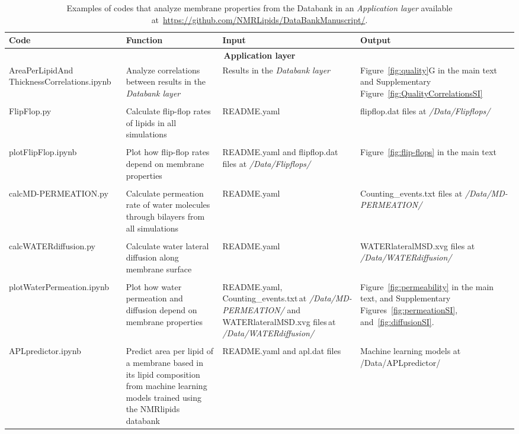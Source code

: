 \documentclass[fleqn,10pt]{wlscirepSI}
\begin{document}
\begin{table}[!h]
    \centering
    \begin{tabular}{p{3.5cm}  p{4.5cm}  p{3.0cm}  p{4.0cm}}
        Code & Function & Input & Output \\
        \hline
        \multicolumn{4}{c}{ {\bf Application layer}}\\
        \hline
        AreaPerLipidAnd ThicknessCorrelations.ipynb  & Analyze correlations between results in the {\it Databank layer}  & Results in the {\it Databank layer} & Figure~\ref{fig:quality}G in the main text and Supplementary Figure~\ref{fig:QualityCorrelationsSI} \\
        \\
        FlipFlop.py & Calculate flip-flop rates of lipids in all simulations & README.yaml & flipflop.dat files at {\it /Data/Flipflops/} \\
        \\
        plotFlipFlop.ipynb & Plot how flip-flop rates depend on membrane properties & README.yaml and flipflop.dat files at {\it /Data/Flipflops/} & Figure~\ref{fig:flip-flops} in the main text \\
        \\
        calcMD-PERMEATION.py  & Calculate permeation rate of water molecules through bilayers from all simulations & README.yaml & Counting\_events.txt files at {\it /Data/MD-PERMEATION/} \\
        \\
        calcWATERdiffusion.py & Calculate water lateral diffusion along membrane surface & README.yaml & WATERlateralMSD.xvg files at {\it /Data/WATERdiffusion/} \\
        \\
        plotWaterPermeation.ipynb & Plot how water permeation and diffusion depend on membrane properties & README.yaml, Counting\_events.txt\,at {\it /Data/MD-PERMEATION/} and\,WATERlateralMSD.xvg files\,at {\it /Data/WATERdiffusion/} & Figure~\ref{fig:permeability} in the main text, and Supplementary Figures~\ref{fig:permeationSI}, and~\ref{fig:diffusionSI}. \\
        \\
        APLpredictor.ipynb & Predict area per lipid of a membrane based in its lipid composition from machine learning models trained using the NMRlipids databank & README.yaml and apl.dat files & Machine learning models at /Data/APLpredictor/ \\ 
    \end{tabular}
    \caption{Examples of codes that analyze membrane properties from the Databank in an {\it Application layer} available at~\url{https://github.com/NMRLipids/DataBankManuscript/}.}
    \label{tab:codesApplication}
\end{table}
\end{document}
